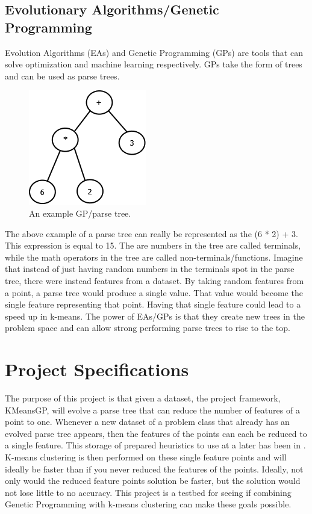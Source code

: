 \documentclass[conference]{IEEEtran}
\begin{document}
\subsection{Evolutionary Algorithms/Genetic Programming}
Evolution Algorithms (EAs) and Genetic Programming (GPs) are tools that can solve optimization and machine learning respectively\cite{EibenAE2007}.  GPs take the form of trees and can be used as parse trees.

\begin{figure}[H]
\begin{center}
\includegraphics[width=0.4\columnwidth]{ParseTreeExample.png}
\caption{An example GP/parse tree.}
\end{center}
\label{fig}
\end{figure}

The above example of a parse tree can really be represented as the (6 * 2) + 3.  This expression is equal to 15.  The are numbers in the tree are called terminals, while the math operators in the tree are called non-terminals/functions.  Imagine that instead of just having random numbers in the terminals spot in the parse tree, there were instead features from a dataset.  By taking  random features from a point, a parse tree would produce a single value.  That value would become the single feature representing that point.  Having that single feature could lead to a speed up in k-means.  The power of EAs/GPs is that they create new trees in the problem space and can allow strong performing parse trees to rise to the top\cite{EibenAE2007}.

\clearpage

\section{Project Specifications}
The purpose of this project is that given a dataset, the project framework, KMeansGP, will evolve a parse tree that can reduce the number of features of a point to one.  Whenever a new dataset of a problem class that already has an evolved parse tree appears, then the features of the points can each be reduced to a single feature.  This storage of prepared heuristics to use at a later has been in \cite{Illetskova2017}.  K-means clustering is then performed on these single feature points and will ideally be faster than if you never reduced the features of the points.  Ideally, not only would the reduced feature points solution be faster, but the solution would not lose little to no accuracy.  This project is a testbed for seeing if combining Genetic Programming with k-means clustering can make these goals possible.
\clearpage
\end{document}
